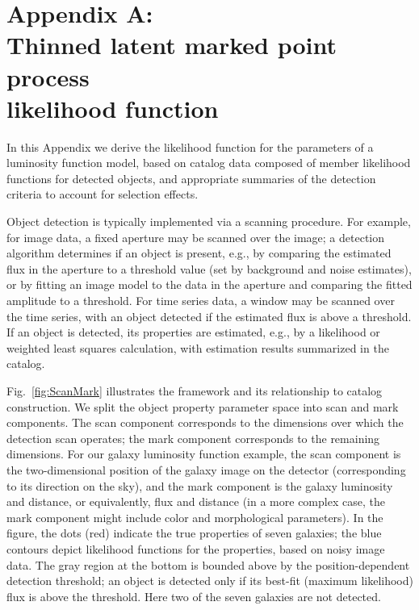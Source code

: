 \documentclass[12pt]{article}
\numberwithin{equation}{section}
\numberwithin{figure}{section}
\numberwithin{table}{section}
\begin{document}
\section*{Appendix A:\\Thinned latent marked point process\\ likelihood function}
\renewcommand{\theequation}{A.\arabic{equation}}
\renewcommand{\thefigure}{A.\arabic{figure}}




In this Appendix we derive the likelihood function for the parameters of a luminosity function model, based on catalog data composed of member likelihood functions for detected objects, and appropriate summaries of the detection criteria to account for selection effects.

Object detection is typically implemented via a scanning procedure.
For example, for image data, a fixed aperture may be scanned over the image; a detection algorithm determines if an object is present, e.g., by comparing the estimated flux in the aperture to a threshold value (set by background and noise estimates), or by fitting an image model to the data in the aperture and comparing the fitted amplitude to a threshold.
For time series data, a window may be scanned over the time series, with an object detected if the estimated flux is above a threshold.
If an object is detected, its properties are estimated, e.g., by a likelihood or weighted least squares calculation, with estimation results summarized in the catalog.

Fig.~\ref{fig:ScanMark} illustrates the framework and its relationship to catalog construction.
We split the object property parameter space into scan and mark components.
The scan component corresponds to the dimensions over which the detection scan operates; 
the mark component corresponds to the remaining dimensions.
For our galaxy luminosity function example, the scan component is the two-dimensional position of the galaxy image on the detector (corresponding to its direction on the sky), and the mark component is the galaxy luminosity and distance, or equivalently, flux and distance (in a more complex case, the mark component might include color and morphological parameters).
In the figure, the dots (red) indicate the true properties of seven galaxies; the blue contours depict likelihood functions for the properties, based on noisy image data.
The gray region at the bottom is bounded above by the position-dependent detection threshold; an object is detected only if its best-fit (maximum likelihood) flux is above the threshold.
Here two of the seven galaxies are not detected.
\end{document}
